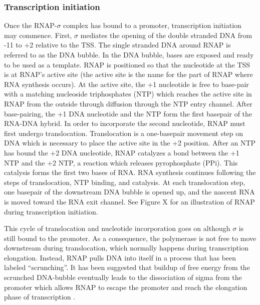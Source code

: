 \subsubsection{Transcription initiation}
Once the RNAP-$\sigma$ complex has bound to a promoter, transcription
initiation may commence. First, $\sigma$ mediates the opening of the double
stranded DNA from -11 to +2 relative to the TSS. The single stranded DNA around
RNAP is referred to as the DNA bubble. In the DNA bubble, bases are exposed and
ready to be used as a template. RNAP is positioned so that the nucleotide at
the TSS is at RNAP's active site (the active site is the name for the part of
RNAP where RNA synthesis occurs). At the active site, the +1 nucleotide is free
to base-pair with a matching nucleoside triphosphates (NTP) which reaches the
active site in RNAP from the outside through diffusion through the NTP entry
channel.  After base-pairing, the +1 DNA nucleotide and the NTP form the first
basepair of the RNA-DNA hybrid. In order to incorporate the second nucleotide,
RNAP must first undergo translocation. Translocation is a one-basepair movement
step on DNA which is necessary to place the active site in the +2 position.
After an NTP has bound the +2 DNA nucleotide, RNAP catalyzes a bond between the
+1 NTP and the +2 NTP, a reaction which releases pyrophosphate (PPi). This
catalysis forms the first two bases of RNA. RNA synthesis continues following
the steps of translocation, NTP binding, and catalysis. At each translocation
step, one basepair of the downstream DNA bubble is opened up, and the nascent
RNA is moved toward the RNA exit channel.  See Figure X for an illustration of
RNAP during transcription initiation.

This cycle of translocation and nucleotide incorporation goes on although $\sigma$
is still bound to the promoter. As a consequence, the polymerase is not free to
move downstream during translocation, which normally happens during
transcription elongation. Instead, RNAP pulls DNA into itself in a process
that has been labeled ``scrunching''. It has been suggested that buildup of
free energy from the scrunched DNA-bubble eventually leads to the dissociation
of sigma from the promoter which allows RNAP to escape the promoter and reach
the elongation phase of transcription \cite{revyakin_abortive_2006}.

